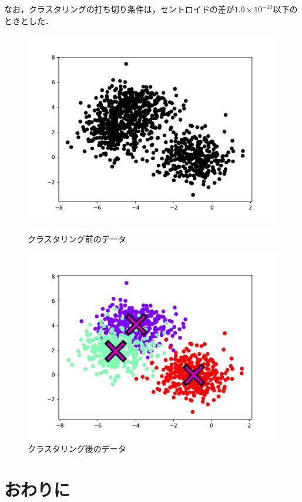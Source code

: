 \documentclass[9pt,a4j,twocolumn]{ltjsarticle}
\begin{document}
なお，クラスタリングの打ち切り条件は，セントロイドの差が$1.0\times10^{-10}$以下のときとした．
\begin{figure}[htbp]
	\begin{center}
		\includegraphics[width=0.8\linewidth]{img/k-means/before.pdf}
		\caption{クラスタリング前のデータ}
		\label{img:kmeans-before}
	\end{center}
	\begin{center}
		\includegraphics[width=0.8\linewidth]{img/k-means/after.pdf}
		\caption{クラスタリング後のデータ}
		\label{img:kmeans-after}
	\end{center}
\end{figure}
\section{おわりに}

\printbibliography[title=参考文献]
\end{document}
